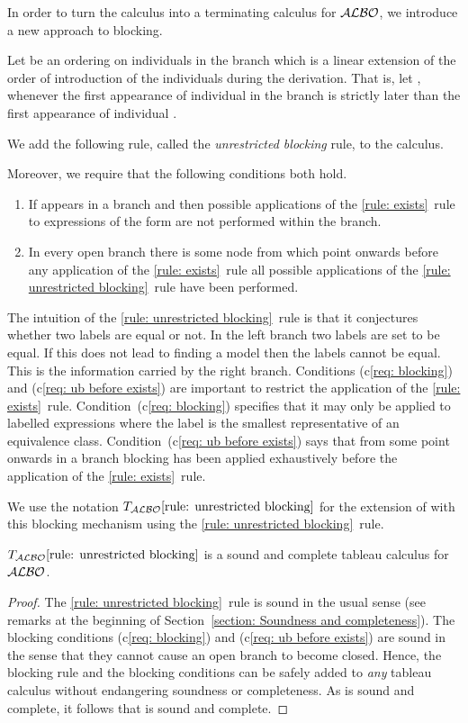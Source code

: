 \documentclass[leqno
,pdflatex
,prodmode
,acmtocl
]{acmsmall}
\newcommand{\mathcmd}[1]{\ensuremath{#1}\xspace}
\newcommand{\dlfont}{\mathcal}
\newcommand{\dl}[1]{\mathcmd{\dlfont{#1}}}
\newcommand{\ALBOid}{\dl{ALBO\smash[t]{\mbox{}}}}
\newcommand{\TALBOidub}{\mathcmd{T_\ALBOid\eqref{rule: unrestricted blocking}}}
\begin{document}
In order to turn the calculus  into a terminating calculus
for \ALBOid, we introduce a new approach to blocking.

Let  be an ordering on individuals in the branch which is a linear
extension of the order of introduction of the individuals during
the derivation.
That is, let , whenever
the first appearance of individual  in
the branch is strictly later than the first appearance of individual
.

We add the following rule, called the \emph{unrestricted blocking}
rule, to the calculus. 

Moreover, we require that the following conditions both hold.
\begin{enumerate}[(c1)]
\item\label{req: blocking}
If  appears in a branch and  then
possible applications of the \eqref{rule: exists}~rule to expressions
of the form 
are not performed within the branch.
\item\label{req: ub before exists}
In every open branch there is some node from which point onwards
before any application of the \eqref{rule: exists}~rule
all possible applications of the \eqref{rule: unrestricted blocking}~rule
have been performed. 
\end{enumerate}

The intuition of the \eqref{rule: unrestricted blocking}~rule is that
it conjectures whether two labels are equal or not.
In the left branch two labels are set to be equal. If this does not 
lead to finding a model then the labels cannot be equal. This is the
information carried by the right branch.
Conditions (c\ref{req: blocking}) and (c\ref{req: ub before exists})
are important to restrict the application of the \eqref{rule: exists}~rule.
Condition~(c\ref{req: blocking}) specifies that it may only be applied to labelled expressions
where the label is the smallest representative of an equivalence class.
Condition~(c\ref{req: ub before exists}) says that from some point
onwards in a branch blocking has been applied exhaustively before
the application of the \eqref{rule: exists}~rule.

We use the notation \TALBOidub for the extension of  with 
this blocking mechanism using the \eqref{rule: unrestricted blocking}~rule.

\begin{theorem}
 \TALBOidub is a sound and complete tableau calculus for \ALBOid.
\end{theorem}
\begin{proof}
The \eqref{rule: unrestricted blocking}~rule is sound in the usual
sense (see remarks at the beginning of Section~\ref{section: Soundness and completeness}).
The blocking conditions (c\ref{req: blocking}) and (c\ref{req: ub before exists}) are sound in the sense that
they cannot cause an open branch to become closed.
Hence, the blocking rule and the blocking conditions can be safely
added to \emph{any} tableau calculus without endangering soundness
or completeness.
As  is sound and complete, it follows that 
is sound and complete.
\end{proof}
\end{document}
